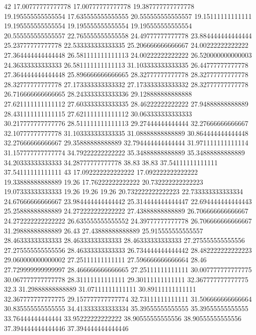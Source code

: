 42 17.00777777777778 17.00777777777778 19.387777777777778 19.195555555555554 17.635555555555555 20.555555555555557 19.15111111111111 19.195555555555554 19.195555555555554 19.195555555555554 20.555555555555557 22.765555555555558 24.49777777777778 23.884444444444444 25.23777777777778 22.533333333333335 25.206666666666667 24.00222222222222 27.364444444444448 26.581111111111113 24.00222222222222 26.520000000000003 24.36333333333333 26.581111111111113 31.103333333333335 26.44777777777778 27.364444444444448 25.896666666666665 28.32777777777778 28.32777777777778 28.32777777777778 27.173333333333332 27.173333333333332 28.32777777777778 26.716666666666665 28.243333333333336 29.128888888888888 27.621111111111112 27.603333333333335 28.46222222222222 27.94888888888889 28.431111111111115 27.621111111111112 30.063333333333333 30.217777777777776 28.511111111111113 29.27444444444444 32.27666666666667 32.10777777777778 31.103333333333335 31.08888888888889 30.864444444444448 32.27666666666667 29.35888888888889 32.794444444444444 31.971111111111114 31.157777777777774 34.79222222222222 35.34888888888889 35.34888888888889 34.20333333333333 34.28777777777778 38.83 38.83 37.54111111111111 37.54111111111111
43 17.092222222222222 17.092222222222222 19.33888888888889 19.26 17.76222222222222 20.732222222222223 19.07333333333333 19.26 19.26 19.26 20.732222222222223 22.733333333333334 24.67666666666667 23.984444444444442 25.314444444444447 22.694444444444443 25.25888888888889 24.272222222222222 27.43888888888889 26.706666666666667 24.272222222222222 26.635555555555552 24.39777777777778 26.706666666666667 31.29888888888889 26.43 27.43888888888889 25.915555555555557 28.46333333333333 28.46333333333333 28.46333333333333 27.275555555555556 27.275555555555556 28.46333333333333 26.734444444444442 28.482222222222223 29.060000000000002 27.25111111111111 27.596666666666664 28.46 27.729999999999997 28.466666666666665 27.25111111111111 30.007777777777775 30.067777777777778 28.31111111111111 29.30111111111111 32.367777777777775 32.3 31.29888888888889 31.07111111111111 30.89111111111111 32.367777777777775 29.157777777777774 32.73111111111111 31.506666666666664 30.835555555555555 34.413333333333334 35.39555555555555 35.39555555555555 33.76444444444444 33.95222222222222 38.90555555555556 38.90555555555556 37.394444444444446 37.394444444444446
